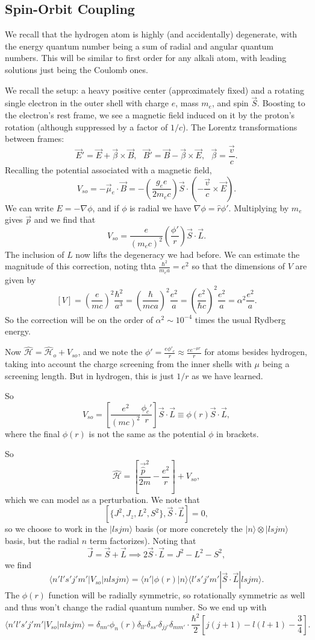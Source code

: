 \documentclass[fontsize=12pt]{scrartcl}
\newcommand{\la}{\langle}
\newcommand{\ra}{\rangle}
\newcommand{\momv}{\vec{\hat{p}}}
\newcommand{\Ham}{\hat{\mathcal{H}}}
\begin{document}
\subsection{Spin-Orbit Coupling}

We recall that the hydrogen atom is highly (and accidentally) degenerate, with the energy quantum number being a sum of radial and angular quantum numbers. This will be similar to first order for any alkali atom, with leading solutions just being the Coulomb ones.

We recall the setup: a heavy positive center (approximately fixed) and a rotating single electron in the outer shell with charge $e$, mass $m_e$, and spin $\vec{S}$. Boosting to the electron's rest frame, we see a magnetic field induced on it by the proton's rotation (although suppressed by a factor of $1/c$). The Lorentz transformations between frames: $$\vec{E}'=\vec{E}+\vec{\beta}\times\vec{B}, \ \ \ \vec{B}'=\vec{B}-\vec{\beta}\times\vec{E}, \ \ \ \vec{\beta}=\frac{\vec{v}}{c}.$$ Recalling the potential associated with a magnetic field, $$V_{so}=-\vec{\mu}_e\cdot\vec{B}=-\left(\frac{g_ee}{2m_ec}\right)\vec{S}\cdot\left(-\frac{\vec{v}}{c}\times\vec{E}\right).$$ We can write $E=-\nabla\phi$, and if $\phi$ is radial we have $\nabla\phi=\hat{r}\phi'$. Multiplying by $m_e$ gives $\vec{p}$ and we find that $$V_{so}=\frac{e}{(m_ec)^2}\left(\frac{\phi'}{r}\right)\vec{S}\cdot\vec{L}.$$ The inclusion of $L$ now lifts the degeneracy we had before. We can estimate the magnitude of this correction, noting thta $\frac{\hbar^2}{m_ea}=e^2$ so that the dimensions of $V$ are given by $$[V]=\left(\frac{e}{mc}\right)^2\frac{\hbar^2}{a^3}=\left(\frac{\hbar}{mca}\right)^2\frac{e^2}{a}=\left(\frac{e^2}{\hbar c}\right)^2\frac{e^2}{a}=\alpha^2\frac{e^2}{a}.$$ So the correction will be on the order of $\alpha^2\sim 10^{-4}$ times the usual Rydberg energy.

Now $\Ham=\Ham_o+V_{so}$, and we note the $\phi'=\frac{e\phi'_c}{r}\approx \frac{ee^{-\mu r}}{r}$ for atoms besides hydrogen, taking into account the charge screening from the inner shells with $\mu$ being a screening length. But in hydrogen, this is just $1/r$ as we have learned.

So $$V_{so}=\left[\frac{e^2}{(mc)^2}\frac{\phi_c'}{r}\right]\vec{S}\cdot\vec{L}\equiv \phi(r)\vec{S}\cdot\vec{L},$$ where the final $\phi(r)$ is not the same as the potential $\phi$ in brackets.

So $$\Ham=\left[\frac{\momv^2}{2m}-\frac{e^2}{r}\right]+V_{so},$$ which we can model as a perturbation. We note that $$[\{J^2,J_z,L^2, S^2\}, \vec{S}\cdot\vec{L}]=0,$$ so we choose to work in the $|lsjm\ra$ basis (or more concretely the $|n\ra\otimes|lsjm\ra$ basis, but the radial $n$ term factorizes). Noting that $$\vec{J}=\vec{S}+\vec{L}\implies 2\vec{S}\cdot\vec{L}=J^2-L^2-S^2,$$ we find $$\la n'l's'j'm'|V_{so}|nlsjm\ra = \la n'|\phi(r)|n\ra\la l's'j'm'|\vec{S}\cdot\vec{L}|lsjm\ra.$$ The $\phi(r)$ function will be radially symmetric, so rotationally symmetric as well and thus won't change the radial quantum number.  So we end up with $$\la n'l's'j'm'|V_{so}|nlsjm\ra = \delta_{nn'}\phi_n(r)\delta_{ll'}\delta_{ss'}\delta_{jj'}\delta_{mm'}\cdot \frac{\hbar^2}{2}\left[j(j+1)-l(l+1)-\frac{3}{4}\right].$$
\end{document}
